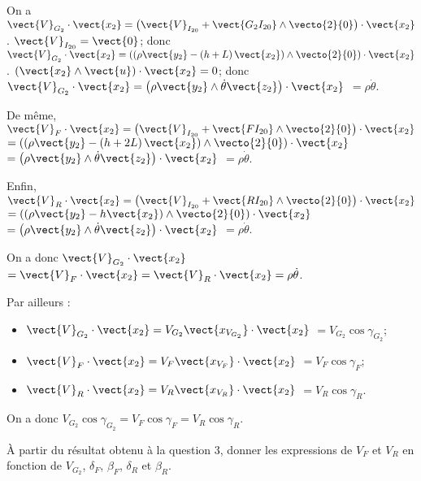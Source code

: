 \documentclass[11pt]{article}
\begin{document}
\begin{UPSTIcorrige}

On a $\vect{V}_{G_2} \cdot \vect{x_2}=\left(\vect{V}_{I_{20}}+\vect{G_2 I_{20}}\wedge \vecto{2}{0}\right)  \cdot \vect{x_2}$. $\vect{V}_{I_{20}}=\vect{0}$; donc $\vect{V}_{G_2} \cdot \vect{x_2}=\left(\left(\rho \vect{y_2} - \left(h+L\right)\vect{x_2}\right) \wedge \vecto{2}{0}\right)  \cdot \vect{x_2}$ .  $\left(\vect{x_2}\wedge \vect{u}\right)\cdot \vect{x_2} = 0$; donc 
$\vect{V}_{G_2} \cdot \vect{x_2}=\left(\rho \vect{y_2}  \wedge  \dot{\theta} \vect{z_2}\right)  \cdot \vect{x_2}$
$=\rho \dot{\theta} $.

De même,  $\vect{V}_{F} \cdot \vect{x_2} =\left(\vect{V}_{I_{20}}+\vect{F I_{20}}\wedge \vecto{2}{0}\right) \cdot \vect{x_2}$
$=\left(\left(\rho \vect{y_2} - \left(h+2L\right)\vect{x_2}\right)\wedge \vecto{2}{0}\right) \cdot \vect{x_2}$
$=\left(\rho \vect{y_2} \wedge  \dot{\theta} \vect{z_2}\right) \cdot \vect{x_2}$
$=\rho \dot{\theta} $.

Enfin, $\vect{V}_{R}\cdot \vect{x_2}=\left(\vect{V}_{I_{20}}+\vect{R I_{20}}\wedge \vecto{2}{0}\right) \cdot \vect{x_2}$
$=\left( \left(\rho \vect{y_2} - h\vect{x_2}\right)\wedge \vecto{2}{0}\right) \cdot \vect{x_2}$
$=\left(\rho \vect{y_2} \wedge \dot{\theta} \vect{z_2}\right) \cdot \vect{x_2}$
$=\rho \dot{\theta} $.


On a donc $\vect{V}_{G_2}\cdot\vect{x_2}$ $=\vect{V}_{F}\cdot\vect{x_2}=\vect{V}_{R}\cdot\vect{x_2} = \rho\dot{\theta}$.



Par ailleurs : 
\begin{itemize}
\item $\vect{V}_{G_2}\cdot\vect{x_2} = V_{G_2} \vect{x_{V_{G_2}}} \cdot\vect{x_2}$ $=V_{G_2} \cos \gamma_{G_2}$;
\item $\vect{V}_{F}\cdot\vect{x_2}={V}_{F}\vect{x_{V_F}}\cdot\vect{x_2}$  $=V_{F} \cos \gamma_{F}$;
\item $\vect{V}_{R}\cdot\vect{x_2}={V}_{R}\vect{x_{V_R}}\cdot\vect{x_2}$   $=V_{R} \cos \gamma_{R}$.
\end{itemize}

On a donc  $V_{G_2} \cos \gamma_{G_2}=V_{F} \cos \gamma_{F}=V_{R} \cos \gamma_{R}$.

\end{UPSTIcorrige}



\UPSTIquestion À partir du résultat obtenu à la question 3, donner les expressions de $V_F$ et $V_R$ en fonction de $V_{G_2}$, $\delta_F$, $\beta_F$, $\delta_R$ et $\beta_R$. 
\end{document}
